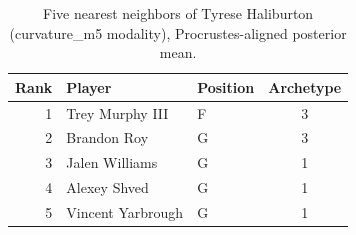 \begin{table}[htbp]
  \centering\small
  \begin{tabular}{rllc}
    \toprule
    Rank & Player & Position & Archetype \\
    \midrule
    1 & Trey Murphy III & F & 3 \\
    2 & Brandon Roy & G & 3 \\
    3 & Jalen Williams & G & 1 \\
    4 & Alexey Shved & G & 1 \\
    5 & Vincent Yarbrough & G & 1 \\
    \bottomrule
  \end{tabular}
  \caption{Five nearest neighbors of Tyrese Haliburton (curvature_m5 modality), Procrustes-aligned posterior mean.}
  \label{tab:Tyrese_Haliburton_neighbors_curvature_m5}
\end{table}

